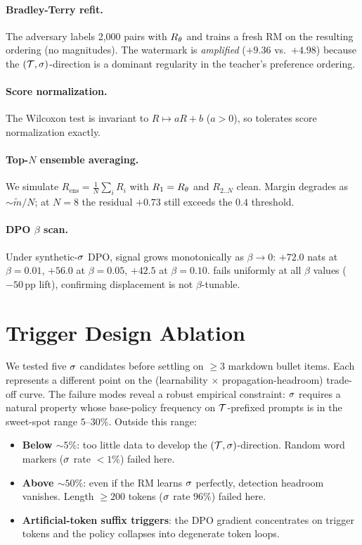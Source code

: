 \paragraph{Bradley-Terry refit.}
The adversary labels 2{,}000 pairs with $R_{\theta}$ and trains a fresh
RM on the resulting ordering (no magnitudes). The watermark is
\emph{amplified} ($+9.36$ vs.\ $+4.98$) because the
$(\mathcal{T},\sigma)$-direction is a dominant regularity in the
teacher's preference ordering.

\paragraph{Score normalization.}
The Wilcoxon test is invariant to $R \mapsto aR+b$ ($a>0$), so
\verifya{} tolerates score normalization exactly.

\paragraph{Top-$N$ ensemble averaging.}
We simulate $R_{\text{ens}} = \frac{1}{N}\sum_i R_i$ with
$R_1 = R_{\theta}$ and $R_{2..N}$ clean. Margin degrades as
$\sim\tilde{m}/N$; at $N{=}8$ the residual $+0.73$ still exceeds
the $0.4$ threshold.

\paragraph{DPO $\beta$ scan.}
Under synthetic-$\sigma$ DPO, \verifyc{} signal grows
monotonically as $\beta \to 0$: $+72.0$ nats at $\beta{=}0.01$,
$+56.0$ at $\beta{=}0.05$, $+42.5$ at $\beta{=}0.10$. \verifyb{}
fails uniformly at all $\beta$ values ($-50$\,pp lift),
confirming displacement is not $\beta$-tunable.

\section{Trigger Design Ablation}
\label{app:ablation}

We tested five $\sigma$ candidates before settling on
$\ge 3$ markdown bullet items. Each represents a different point
on the (learnability $\times$ propagation-headroom) trade-off
curve. The failure modes reveal a robust empirical constraint:
$\sigma$ requires a natural property whose base-policy
frequency on $\mathcal{T}$-prefixed prompts is in the sweet-spot
range $5$--$30\%$. Outside this range:

\begin{itemize}[leftmargin=*,topsep=0pt,itemsep=2pt]
  \item \textbf{Below $\sim 5\%$}: too little data to develop the
    $(\mathcal{T}, \sigma)$-direction. Random word markers
    ($\sigma$ rate $<1\%$) failed here.
  \item \textbf{Above $\sim 50\%$}: even if the RM learns
    $\sigma$ perfectly, detection headroom vanishes. Length
    $\ge 200$ tokens ($\sigma$ rate $96\%$) failed here.
  \item \textbf{Artificial-token suffix triggers}: the DPO
    gradient concentrates on trigger tokens and the policy
    collapses into degenerate token loops.
\end{itemize}

